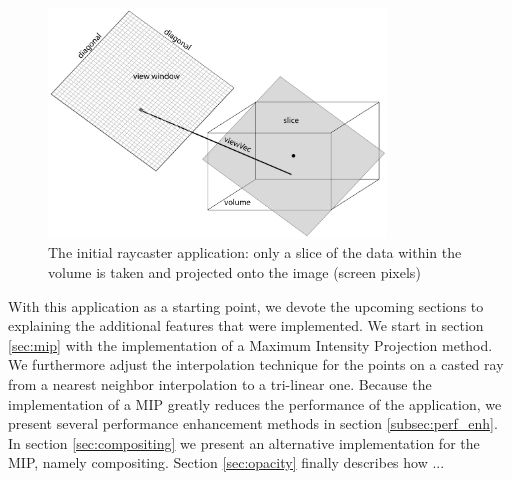 \begin{figure}[h!]
    \centering
    \captionsetup{justification=centering,margin=0.5cm}
    \includegraphics[width=0.8\textwidth]{img/raycaster0.pdf}
    \caption{The initial raycaster application: only a slice of the data within the volume is taken and projected onto the image (screen pixels)}
    \label{fig:raycaster0}
\end{figure}

With this application as a starting point, we devote the upcoming sections to explaining the additional features that were implemented. We start in section \ref{sec:mip} with the implementation of a Maximum Intensity Projection method. We furthermore adjust the interpolation technique for the points on a casted ray from a nearest neighbor interpolation to a tri-linear one. Because the implementation of a MIP greatly reduces the performance of the application, we present several performance enhancement methods in section \ref{subsec:perf_enh}. In section \ref{sec:compositing} we present an alternative implementation for the MIP, namely compositing. Section \ref{sec:opacity} finally describes how ...\todo{!}


